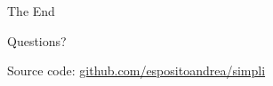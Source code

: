 \documentclass{beamer}
\begin{document}
{
	\settocustomtemplate
	\begin{frame}
		\color{white}
		\vfill
		\begin{center}
			\Large
			The End
		\end{center}
		\begin{center}
			\small
			Questions?
		\end{center}
		\vfill
		\begin{center}
			\scriptsize
			Source code:
			\href{https://github.com/espositoandrea/simpli}{%
				\color{mylinkcolor}github.com/espositoandrea/simpli
			}
		\end{center}
	\end{frame}
}
\end{document}
